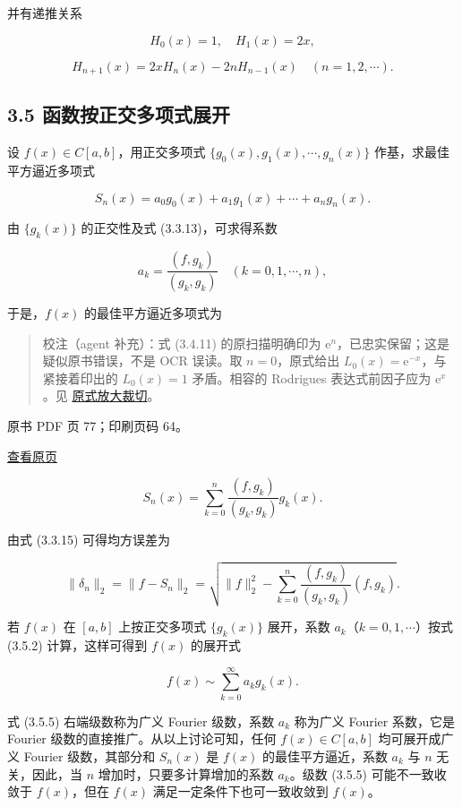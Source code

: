 并有递推关系

\[
H_0(x)=1,\quad H_1(x)=2x,
\]

\[
H_{n+1}(x)=2xH_n(x)-2nH_{n-1}(x)\quad(n=1,2,\cdots).
\]

\subsection{3.5 函数按正交多项式展开}\label{ch03b-ux51fdux6570ux6309ux6b63ux4ea4ux591aux9879ux5f0fux5c55ux5f00}

设 \(f(x)\in C[a,b]\)，用正交多项式 \(\{g_0(x),g_1(x),\cdots,g_n(x)\}\) 作基，求最佳平方逼近多项式

\[
S_n(x)=a_0g_0(x)+a_1g_1(x)+\cdots+a_ng_n(x).\tag{3.5.1}
\]

由 \(\{g_k(x)\}\) 的正交性及式 (3.3.13)，可求得系数

\[
a_k=\frac{(f,g_k)}{(g_k,g_k)}\quad(k=0,1,\cdots,n),\tag{3.5.2}
\]

于是，\(f(x)\) 的最佳平方逼近多项式为

\begin{quote}
校注（agent 补充）：式 (3.4.11) 的原扫描明确印为 \(\mathrm e^n\)，已忠实保留；这是疑似原书错误，不是 OCR 误读。取 \(n=0\)，原式给出 \(L_0(x)=\mathrm e^{-x}\)，与紧接着印出的 \(L_0(x)=1\) 矛盾。相容的 Rodrigues 表达式前因子应为 \(\mathrm e^x\)。见 \href{verified/assets/ch03b/p076-laguerre-formula.png}{原式放大裁切}。
\end{quote}

\clearpage

原书 PDF 页 77；印刷页码 64。

\href{source-images/pdf-077.jpeg}{查看原页}

\[
S_n(x)=\sum_{k=0}^n\frac{(f,g_k)}{(g_k,g_k)}g_k(x).\tag{3.5.3}
\]

由式 (3.3.15) 可得均方误差为

\[
\|\delta_n\|_2=\|f-S_n\|_2=\sqrt{\|f\|_2^2-\sum_{k=0}^n\frac{(f,g_k)}{(g_k,g_k)}(f,g_k)}.\tag{3.5.4}
\]

若 \(f(x)\) 在 \([a,b]\) 上按正交多项式 \(\{g_k(x)\}\) 展开，系数 \(a_k\)（\(k=0,1,\cdots\)）按式 (3.5.2) 计算，这样可得到 \(f(x)\) 的展开式

\[
f(x)\sim\sum_{k=0}^\infty a_kg_k(x).\tag{3.5.5}
\]

式 (3.5.5) 右端级数称为广义 Fourier 级数，系数 \(a_k\) 称为广义 Fourier 系数，它是 Fourier 级数的直接推广。从以上讨论可知，任何 \(f(x)\in C[a,b]\) 均可展开成广义 Fourier 级数，其部分和 \(S_n(x)\) 是 \(f(x)\) 的最佳平方逼近，系数 \(a_k\) 与 \(n\) 无关，因此，当 \(n\) 增加时，只要多计算增加的系数 \(a_k\)。级数 (3.5.5) 可能不一致收敛于 \(f(x)\)，但在 \(f(x)\) 满足一定条件下也可一致收敛到 \(f(x)\)。

